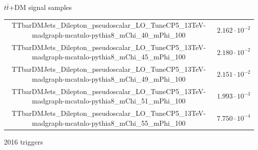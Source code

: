 \documentclass[8pt]{beamer}
\begin{document}
\begin{frame}{$t \bar t$+DM signal samples}
\begin{table}
\begin{center}
{\begin{tabular}{ c|c }
 TTbarDMJets\_Dilepton\_pseudoscalar\_LO\_TuneCP5\_13TeV-madgraph-mcatnlo-pythia8\_mChi\_40\_mPhi\_100 & $2.162 \cdot 10^{-2}$ \\
 TTbarDMJets\_Dilepton\_pseudoscalar\_LO\_TuneCP5\_13TeV-madgraph-mcatnlo-pythia8\_mChi\_45\_mPhi\_100 & $2.180 \cdot 10^{-2}$ \\
 TTbarDMJets\_Dilepton\_pseudoscalar\_LO\_TuneCP5\_13TeV-madgraph-mcatnlo-pythia8\_mChi\_49\_mPhi\_100 & $2.151 \cdot 10^{-2}$ \\
 TTbarDMJets\_Dilepton\_pseudoscalar\_LO\_TuneCP5\_13TeV-madgraph-mcatnlo-pythia8\_mChi\_51\_mPhi\_100 & $1.993 \cdot 10^{-3}$ \\
 TTbarDMJets\_Dilepton\_pseudoscalar\_LO\_TuneCP5\_13TeV-madgraph-mcatnlo-pythia8\_mChi\_55\_mPhi\_100 & $7.750 \cdot 10^{-4}$ \\
 \hline
\end{tabular}
}
\end{center}
\end{table}
\end{frame}

\begin{frame}{2016 triggers}
\justifying
\begin{table}
\begin{center}
\end{center}
\end{table}	
\end{frame}
\end{document}
